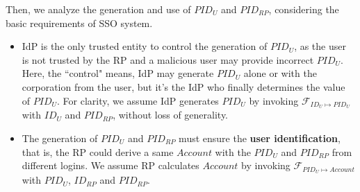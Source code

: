 Then, we analyze the generation and use of $PID_U$ and $PID_{RP}$, considering the basic requirements of SSO system.
\begin{itemize}
  \item %
        IdP is the only trusted entity to control the generation of $PID_U$, as the user is not trusted by the RP and a malicious user may provide incorrect $PID_U$. Here, the ``control" means, IdP may generate $PID_U$ alone or with the corporation from the user, but it's the IdP who finally determines the value of $PID_U$. For clarity, we assume IdP generates $PID_U$ by invoking $\mathcal{F}_{ID_{U} \mapsto PID_{U}}$ with $ID_U$ and $PID_{RP}$, without loss of generality.

  \item %
  The generation of $PID_{U}$ and $PID_{RP}$ must ensure the \textbf{user identification},
  that is, the RP could derive a same $Account$ with the $PID_{U}$ and $PID_{RP}$ from different logins. We assume RP calculates $Account$ by invoking $\mathcal{F}_{PID_{U} \mapsto Account}$ with $PID_U$, $ID_{RP}$ and $PID_{RP}$.


\end{itemize}
